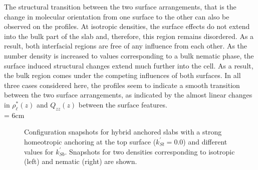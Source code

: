 The structural transition between the two surface arrangements, that is the change in molecular
orientation from one surface to the other can also be observed on the profiles.
At isotropic densities, the surface effects do not extend into the bulk part of the
slab and, therefore, this region remains disordered. As a result, both interfacial regions are
free of any influence from each other. As the number density is increased to values
corresponding to a bulk nematic phase, the surface induced structural changes extend much
further into the cell. As a result, the bulk region comes under the competing influences of both
surfaces. In all three cases considered here, the profiles seem to indicate a smooth transition
between the two surface arrangements, as indicated by the almost linear changes in
$\rho^{*}_\ell(z)$ and $Q_{zz}(z)$ between the surface features.\\





\picW = 6cm
\begin{figure}
	\centering


	\caption{Configuration snapshots for hybrid anchored slabs with a strong
	homeotropic anchoring at the top surface ($k^\prime_{St}=0.0$) and different values for
	$k^\prime_{Sb}$. Snapshots for two densities corresponding to isotropic (left) and
	nematic (right) are shown.}
	\label{fig:typeSnap_HGO_Hconf_k3}
\end{figure}

